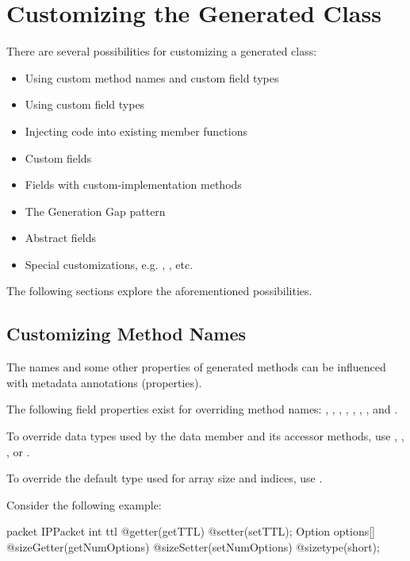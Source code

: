\section{Customizing the Generated Class}
\label{sec:msg-defs:customizing-generated-class}

There are several possibilities for customizing a generated class:

\begin{itemize}
  \item Using custom method names and custom field types
  \item Using custom field types
  \item Injecting code into existing member functions
  \item Custom fields
  \item Fields with custom-implementation methods
  \item The Generation Gap pattern
  \item Abstract fields
  \item Special customizations, e.g. , , etc.
\end{itemize}

The following sections explore the aforementioned possibilities.


\subsection{Customizing Method Names}
\label{sec:msg-defs:customizing-method-names}

The names and some other properties of generated methods can be influenced
with metadata annotations (properties).

The following field properties exist for overriding method names:
, , , ,
, , , 
and .

To override data types used by the data member and its accessor methods, use
, , , or
.

To override the default  type used for array size and indices, use
.

Consider the following example:

\begin{msg}
packet IPPacket {
    int ttl @getter(getTTL) @setter(setTTL);
    Option options[] @sizeGetter(getNumOptions)
                     @sizeSetter(setNumOptions)
                     @sizetype(short);
}
\end{msg}

